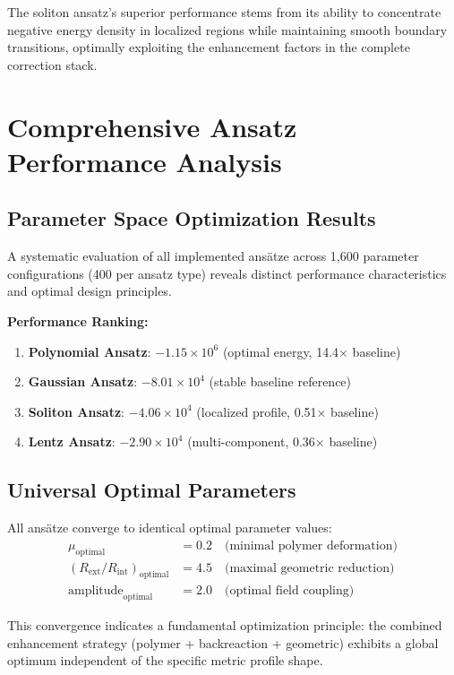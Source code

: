\documentclass[12pt,a4paper]{article}
\begin{document}
The soliton ansatz's superior performance stems from its ability to concentrate negative energy density in localized regions while maintaining smooth boundary transitions, optimally exploiting the enhancement factors in the complete correction stack.

\section{Comprehensive Ansatz Performance Analysis}

\subsection{Parameter Space Optimization Results}

A systematic evaluation of all implemented ansätze across 1,600 parameter configurations (400 per ansatz type) reveals distinct performance characteristics and optimal design principles.

\textbf{Performance Ranking:}
\begin{enumerate}
\item \textbf{Polynomial Ansatz}: $-1.15 \times 10^6$ (optimal energy, 14.4× baseline)
\item \textbf{Gaussian Ansatz}: $-8.01 \times 10^4$ (stable baseline reference)
\item \textbf{Soliton Ansatz}: $-4.06 \times 10^4$ (localized profile, 0.51× baseline)
\item \textbf{Lentz Ansatz}: $-2.90 \times 10^4$ (multi-component, 0.36× baseline)
\end{enumerate}

\subsection{Universal Optimal Parameters}

All ansätze converge to identical optimal parameter values:
\begin{align}
\mu_{\text{optimal}} &= 0.2 \quad \text{(minimal polymer deformation)} \\
(R_{\text{ext}}/R_{\text{int}})_{\text{optimal}} &= 4.5 \quad \text{(maximal geometric reduction)} \\
\text{amplitude}_{\text{optimal}} &= 2.0 \quad \text{(optimal field coupling)}
\end{align}

This convergence indicates a fundamental optimization principle: the combined enhancement strategy (polymer + backreaction + geometric) exhibits a global optimum independent of the specific metric profile shape.
\end{document}
